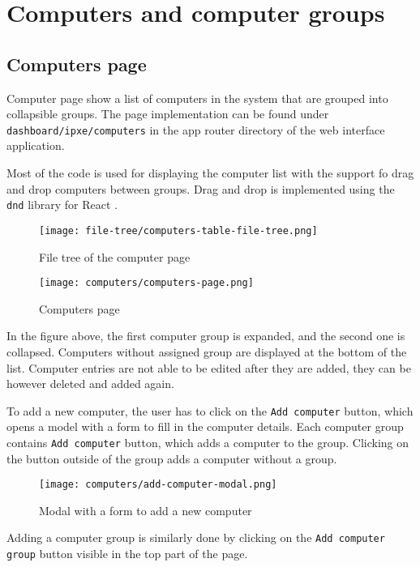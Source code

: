 \documentclass[../main.tex]{subfiles}
\begin{document}
\section{Computers and computer groups}

\subsection{Computers page}

Computer page show a list of computers in the system that are grouped into collapsible groups.
The page implementation can be found under \texttt{dashboard/ipxe/computers} in the
app router directory of the web interface application.

Most of the code is used for displaying the computer list with the support fo drag and drop computers between groups.
Drag and drop is implemented using the \texttt{dnd} library for React \cite{dnd}.

\begin{figure}[H]
  \centering
  \texttt{[image: file-tree/computers-table-file-tree.png]}
  \caption{File tree of the computer page}
\end{figure}

\begin{figure}[H]
  \centering
  \texttt{[image: computers/computers-page.png]}
  \caption{Computers page}
\end{figure}

In the figure above, the first computer group is expanded, and the second one is collapsed. Computers without assigned group are displayed at the bottom of the list.
Computer entries are not able to be edited after they are added, they can be however deleted and added again.

To add a new computer, the user has to click on the \texttt{Add computer} button, which opens a model with a form to fill in the computer details.
Each computer group contains \texttt{Add computer} button, which adds a computer to the group. Clicking on the button outside of the group adds a computer without a group.

\begin{figure}[H]
  \centering
  \texttt{[image: computers/add-computer-modal.png]}
  \caption{Modal with a form to add a new computer}
\end{figure}

Adding a computer group is similarly done by clicking on the \texttt{Add computer group} button visible in the top part of the page.
\end{document}
